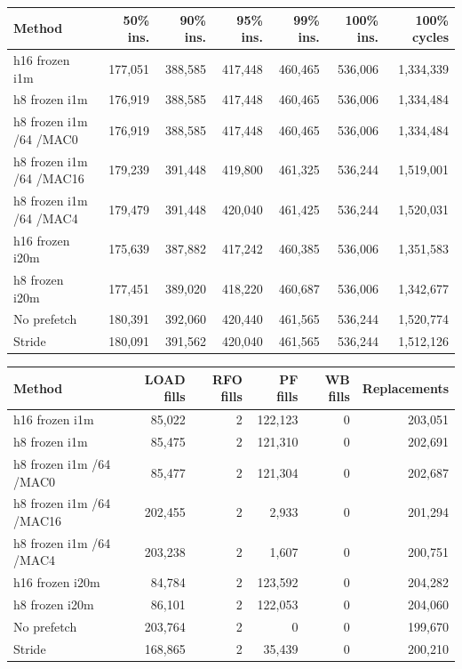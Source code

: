 \documentclass[10pt]{article}
\begin{document}
\begin{center}
\scriptsize
\begin{tabular}{lrrrrrr}
\toprule
Method & 50\% ins. & 90\% ins. & 95\% ins. & 99\% ins. & 100\% ins. & 100\% cycles \\
\midrule
h16 frozen i1m & 177,051 & 388,585 & 417,448 & 460,465 & 536,006 & 1,334,339 \\
h8 frozen i1m & 176,919 & 388,585 & 417,448 & 460,465 & 536,006 & 1,334,484 \\
h8 frozen i1m /64 /MAC0 & 176,919 & 388,585 & 417,448 & 460,465 & 536,006 & 1,334,484 \\
h8 frozen i1m /64 /MAC16 & 179,239 & 391,448 & 419,800 & 461,325 & 536,244 & 1,519,001 \\
h8 frozen i1m /64 /MAC4 & 179,479 & 391,448 & 420,040 & 461,425 & 536,244 & 1,520,031 \\
h16 frozen i20m & 175,639 & 387,882 & 417,242 & 460,385 & 536,006 & 1,351,583 \\
h8 frozen i20m & 177,451 & 389,020 & 418,220 & 460,687 & 536,006 & 1,342,677 \\
No prefetch & 180,391 & 392,060 & 420,440 & 461,565 & 536,244 & 1,520,774 \\
Stride & 180,091 & 391,562 & 420,040 & 461,565 & 536,244 & 1,512,126 \\
\bottomrule
\end{tabular}
\end{center}

\begin{center}
\scriptsize
\begin{tabular}{lrrrrr}
\toprule
Method & LOAD fills & RFO fills & PF fills & WB fills & Replacements \\
\midrule
h16 frozen i1m & 85,022 & 2 & 122,123 & 0 & 203,051 \\
h8 frozen i1m & 85,475 & 2 & 121,310 & 0 & 202,691 \\
h8 frozen i1m /64 /MAC0 & 85,477 & 2 & 121,304 & 0 & 202,687 \\
h8 frozen i1m /64 /MAC16 & 202,455 & 2 & 2,933 & 0 & 201,294 \\
h8 frozen i1m /64 /MAC4 & 203,238 & 2 & 1,607 & 0 & 200,751 \\
h16 frozen i20m & 84,784 & 2 & 123,592 & 0 & 204,282 \\
h8 frozen i20m & 86,101 & 2 & 122,053 & 0 & 204,060 \\
No prefetch & 203,764 & 2 & 0 & 0 & 199,670 \\
Stride & 168,865 & 2 & 35,439 & 0 & 200,210 \\
\bottomrule
\end{tabular}
\end{center}
\end{document}
